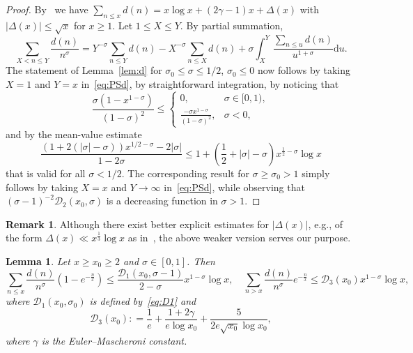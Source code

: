 \documentclass[a4paper,reqno]{amsart}
\newtheorem{lemma}[theorem]{Lemma}
\theoremstyle{definition}
\newtheorem{remark}{Remark}
\newcommand{\de}[0]{\mathrel{\mathop:}=}
\newcommand{\dif}[1]{\mathrm{d}#1}
\begin{document}
\begin{proof}
By~\cite[Theorem~1.1]{BBR} we have $\sum_{n\leq x}d(n)=x\log{x}+(2\gamma-1)x+\Delta(x)$ with $\left|\Delta(x)\right|\leq \sqrt{x}$ for $x\geq 1$. Let $1\leq X\leq Y$. By partial summation,
\begin{equation}
\label{eq:PSd} 
\sum_{X<n\leq Y}\frac{d(n)}{n^\sigma} = Y^{-\sigma}\sum_{n\leq Y}d(n) - X^{-\sigma}\sum_{n\leq X}d(n) + \sigma\int_{X}^{Y}\frac{\sum_{n\leq u}d(n)}{u^{1+\sigma}}\dif{u}.
\end{equation}
The statement of Lemma~\ref{lem:d} for $\sigma_0\leq\sigma\leq 1/2$, $\sigma_0\leq0$ now follows by taking $X=1$ and $Y=x$ in~\eqref{eq:PSd}, by straightforward integration, by noticing that
\[
\frac{\sigma\left(1-x^{1-\sigma}\right)}{(1-\sigma)^{2}} \leq 
\left\{
\begin{array}{ll}
    0, & \sigma\in[0,1), \\
    \frac{-\sigma x^{1-\sigma}}{(1-\sigma)^2}, & \sigma<0,
\end{array}
\right.
\]
and by the mean-value estimate
\[
\frac{\left(1+2\left(|\sigma|-\sigma\right)\right)x^{1/2-\sigma}-2|\sigma|}{1-2\sigma} \leq 1 + \left(\frac{1}{2}+|\sigma|-\sigma\right)x^{\frac{1}{2}-\sigma}\log{x}
\]
that is valid for all $\sigma<1/2$. The corresponding result for $\sigma\geq\sigma_0>1$ simply follows by taking $X=x$ and $Y\to\infty$ in~\eqref{eq:PSd}, while observing that $(\sigma-1)^{-2}\mathcal{D}_{2}(x_0,\sigma)$ is a decreasing function in $\sigma>1$.
\end{proof}

\begin{remark}
Although there exist better explicit estimates for $|\Delta(x)|$, e.g., of the form $\Delta(x) \ll x^{\frac{1}{3}} \log x$ as in~\cite{BBR}, the above weaker version serves our purpose.
\end{remark}

\begin{lemma}
\label{lem:dExp}
Let $x\geq x_0\geq 2$ and $\sigma\in[0,1]$. Then
\[
\sum_{n\leq x}\frac{d(n)}{n^\sigma}\left(1-e^{-\frac{n}{x}}\right) \leq \frac{\mathcal{D}_1(x_0,\sigma-1)}{2-\sigma}x^{1-\sigma}\log{x}, \quad \sum_{n>x}\frac{d(n)}{n^\sigma}e^{-\frac{n}{x}} \leq \mathcal{D}_{3}(x_0)x^{1-\sigma}\log{x},
\]
where $\mathcal{D}_1(x_0,\sigma_0)$ is defined by~\eqref{eq:D1} and
\begin{equation}
\label{eq:D3}
\mathcal{D}_{3}(x_0) \de \frac{1}{e} + \frac{1+2\gamma}{e\log{x_0}} + \frac{5}{2e\sqrt{x_0}\log{x_0}},
\end{equation}
where $\gamma$ is the Euler--Mascheroni constant.
\end{lemma}
\end{document}
